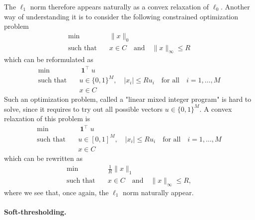 \documentclass[
	fontsize=11pt, %
	twoside=false, %
	numbers=noenddot, %
]{kaobook}
\DeclareMathOperator{\bone}{\boldsymbol 1}
\newcommand{\norm}[1]{\| #1 \|}
\begin{document}
The $\ell_1$ norm therefore appears naturally as a convex relaxation of $\ell_0$.
Another way of understanding it is to consider the following constrained optimization problem
\begin{align*}
	\min \quad &\norm{x}_0 \\ 
	\text{such that} \quad &x \in C \quad \text{and} \quad \norm{x}_\infty \leq R
\end{align*}
which can be reformulated as
\begin{align*}
	\min \quad &\bone^\top u \\ 
	\text{such that} \quad &u \in \{ 0, 1 \}^M, \quad |x_i| \leq R u_i 
	\quad \text{for all} \quad i=1, \ldots, M \\
	&x \in C
\end{align*}
Such an optimization problem, called a "linear mixed integer program" is hard to solve, since it requires to try out all possible vectors $u \in \{ 0, 1 \}^M$.
A convex relaxation of this problem is
\begin{align*}
	\min \quad &\bone^\top u \\ 
	\text{such that} \quad &u \in [0, 1]^M, \quad |x_i| \leq R u_i 
	\quad \text{for all} \quad i=1, \ldots, M \\
	&x \in C
\end{align*}
which can be rewritten as
\begin{align*}
	\min \quad &\frac 1R \norm{x}_1 \\ 
	\text{such that} \quad &x \in C \quad \text{and} \quad \norm{x}_\infty 
	\leq R,
\end{align*}
where we see that, once again, the $\ell_1$ norm naturally appear.

\paragraph{Soft-thresholding.}
\end{document}
